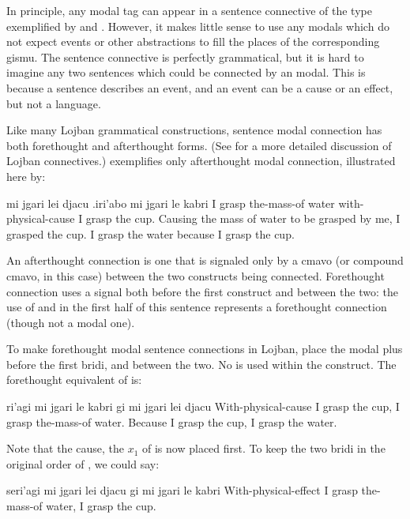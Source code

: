 In principle, any modal tag can appear in a sentence
    connective of the type exemplified by  and . However, it makes
    little sense to use any modals which do not expect events or
    other abstractions to fill the places of the corresponding
    gismu. The sentence connective  is perfectly
    grammatical, but it is hard to imagine any two sentences which
    could be connected by an  modal. This is because
    a sentence describes an event, and an event can be a cause or
    an effect, but not a language.



Like many Lojban grammatical constructions, sentence modal
    connection has both forethought and afterthought forms. (See  for a more detailed
    discussion of Lojban connectives.) 
    exemplifies only afterthought modal connection, illustrated
    here by:
\begin{example}
mi jgari lei djacu .iri'abo mi jgari le kabri\n
I grasp the-mass-of water\n
\T	with-physical-cause I grasp the cup.\n
Causing the mass of water to be grasped by me,\n
\T	I grasped the cup.\n
I grasp the water because I grasp the cup.
\end{example}

An afterthought connection is one that is signaled only by a
    cmavo (or compound cmavo, in this case) between the two
    constructs being connected. Forethought connection uses a
    signal both before the first construct and between the two: the
    use of  and  in the first half of this sentence
    represents a forethought connection (though not a modal one). 

To make forethought modal sentence connections in Lojban,
    place the modal plus  before the first bridi, and 
    between the two. No  is used within the construct. The
    forethought equivalent of 
    is:
\begin{example}
ri'agi mi jgari le kabri\n
\T	gi mi jgari lei djacu\n
With-physical-cause I grasp the cup,\n
\T	I grasp the-mass-of water.\n
Because I grasp the cup, I grasp the water.
\end{example}

Note that the cause, the $x_1$ of  is now placed first.
    To keep the two bridi in the original order of , we could say:
\begin{example}
seri'agi mi jgari lei djacu\n
\T	gi mi jgari le kabri\n
With-physical-effect I grasp the-mass-of water,\n
\T	I grasp the cup.
\end{example}


